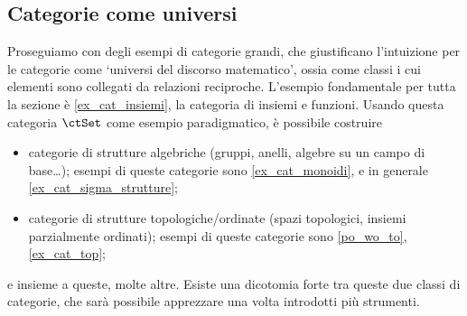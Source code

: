 \subsection{Categorie come universi}\label{ssec:categorie_universi}
Proseguiamo con degli esempi di categorie grandi, che giustificano l'intuizione per le categorie come `universi del discorso matematico', ossia come classi i cui elementi sono collegati da relazioni reciproche. L'esempio fondamentale per tutta la sezione è \ref{ex_cat_insiemi}, la categoria di insiemi e funzioni. Usando questa categoria \(\ctSet\) come esempio paradigmatico, è possibile costruire
\begin{itemize}
	\item categorie di strutture algebriche (gruppi, anelli, algebre su un campo di base\dots); esempi di queste categorie sono \ref{ex_cat_monoidi}, e in generale \ref{ex_cat_sigma_strutture};
	\item categorie di strutture topologiche/ordinate (spazi topologici, insiemi parzialmente ordinati); esempi di queste categorie sono \ref{po_wo_to}, \ref{ex_cat_top};
\end{itemize}
e insieme a queste, molte altre. Esiste una dicotomia forte tra queste due classi di categorie, che sarà possibile apprezzare una volta introdotti più strumenti.

